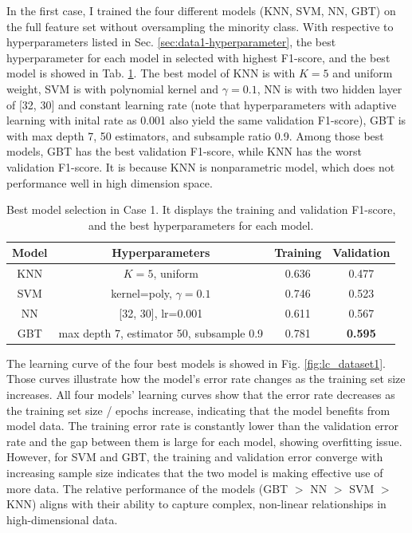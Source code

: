 \documentclass[conference]{IEEEtran}
\begin{document}
In the first case, I trained the four different models (KNN, SVM, NN, GBT) on the full feature set without oversampling the minority class. With respective to hyperparameters listed in Sec. \ref{sec:data1-hyperparameter}, the best hyperparameter for each model in selected with highest F1-score, and the best model is showed in Tab. \ref{tab:case1-best-model}. The best model of KNN is with $K=5$ and uniform weight, SVM is with polynomial kernel and $\gamma=0.1$, NN is with two hidden layer of [32, 30] and constant learning rate (note that hyperparameters with adaptive learning with inital rate as 0.001 also yield the same validation F1-score), GBT is with max depth 7, 50 estimators, and subsample ratio 0.9.  Among those best models, GBT has the best validation F1-score, while KNN has the worst validation F1-score. It is because KNN is nonparametric model, which does not performance well in high dimension space. 
\begin{table}[htbp]
\caption{Best model selection in Case 1. It displays the training and validation F1-score, and the best hyperparameters for each model.}
\begin{center}
\begin{tabular}{|c|c|c|c|}
\hline
\textbf{Model} & {Hyperparameters} & {Training} & {Validation}\\
\hline
KNN & \parbox{3cm}{$K=5$, uniform }& 0.636 & 0.477  \\
\hline
SVM & \parbox{3cm}{kernel=poly, $\gamma=0.1$} & 0.746 & 0.523 \\
\hline
NN & \parbox{3cm}{[32, 30], lr=0.001} & 0.611 & 0.567 \\
\hline
GBT & \parbox{3cm}{max depth 7, estimator 50, subsample 0.9} & 0.781 & \textbf{0.595} \\
\hline 
\end{tabular}
\label{tab:case1-best-model}
\end{center}
\end{table}

The learning curve of the four best models is showed in Fig. \ref{fig:lc_dataset1}. Those curves illustrate how the model's error rate changes as the training set size increases. All four models' learning curves show that the error rate decreases as the training set size / epochs increase, indicating that the model benefits from model data. The training error rate is constantly lower than the validation error rate and the gap between them is large for each model, showing overfitting issue. However, for SVM and GBT, the training and validation error converge with increasing sample size indicates that the two model is making effective use of more data. The relative performance of the models (GBT $>$ NN $>$ SVM $>$ KNN) aligns with their ability to capture complex, non-linear relationships in high-dimensional data.
\end{document}

